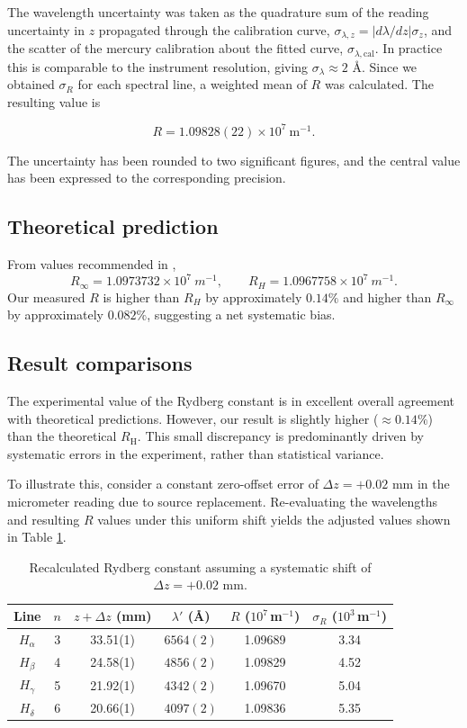 \documentclass[12pt]{article}
\begin{document}
The wavelength uncertainty was taken as the quadrature sum of the reading uncertainty in $z$ propagated through the calibration curve, $\sigma_{\lambda,z}=|d\lambda/dz|\sigma_z$, and the scatter of the mercury calibration about the fitted curve, $\sigma_{\lambda,\mathrm{cal}}$. In practice this is comparable to the instrument resolution, giving $\sigma_\lambda \approx 2$ \AA. Since we obtained $\sigma_R$ for each spectral line, a weighted mean of $R$ was calculated. 
The resulting value is

\[
\boxed{R = 1.09828 (22) \times 10^{7}\ \mathrm{m}^{-1}}.
\]

The uncertainty has been rounded to two significant figures, and the central value has been expressed to the corresponding precision.


\subsection{Theoretical prediction}

From values recommended in \cite{nist_constants},
\[
R_\infty = 1.0973732\times 10^{7}\ \si{m^{-1}},
\qquad
R_H = 1.0967758\times 10^{7}\ \si{m^{-1}}.
\]
Our measured $R$ is higher than $R_H$ by approximately $0.14\%$ and higher than $R_\infty$ by approximately $0.082\%$, suggesting a net systematic bias.



\subsection{Result comparisons}

The experimental value of the Rydberg constant is in excellent overall agreement with theoretical predictions. However, our result is slightly higher ($\approx 0.14\%$) than the theoretical $R_{\mathrm{H}}$. This small discrepancy is predominantly driven by systematic errors in the experiment, rather than statistical variance.

To illustrate this, consider a constant zero-offset error of $\Delta z = +0.02 \text{ mm}$ in the micrometer reading due to source replacement. Re-evaluating the wavelengths and resulting $R$ values under this uniform shift yields the adjusted values shown in Table \ref{rydberg_corrected}.

\begin{table}[htbp]
\centering
\caption{Recalculated Rydberg constant assuming a systematic shift of $\Delta z = +0.02\text{ mm}$. }
\begin{tabular}{c c c c c c}
\hline\hline
Line & $n$ & $z + \Delta z$ (mm) & $\lambda'$ (\AA) 
& $R$ ($10^7$\,m$^{-1}$) 
& $\sigma_R$ ($10^3$\,m$^{-1}$) \\
\hline\hline
$H_\alpha$ & 3 & 33.51(1) & $6564(2)$ & 1.09689 & 3.34 \\
$H_\beta$  & 4 & 24.58(1) & $4856(2)$ & 1.09829 & 4.52 \\
$H_\gamma$ & 5 & 21.92(1) & $4342(2)$ & 1.09670 & 5.04 \\
$H_\delta$ & 6 & 20.66(1) & $4097(2)$ & 1.09836 & 5.35 \\
\hline\hline
\end{tabular}
\label{rydberg_corrected}
\end{table}
\end{document}
